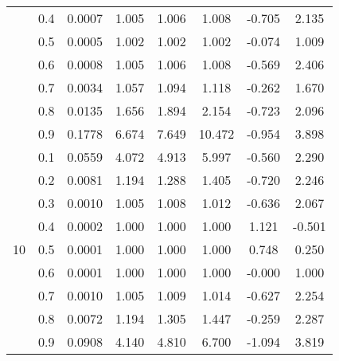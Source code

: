 \documentclass[11pt,a4paper]{report}
\begin{document}
\begin{longtable}{ | c | c || c | c | c | c | c | c | }
 & 0.4 & 0.0007 & 1.005 & 1.006 & 1.008 & -0.705 & 2.135 \\
 & 0.5 & 0.0005 & 1.002 & 1.002 & 1.002 & -0.074 & 1.009 \\
 & 0.6 & 0.0008 & 1.005 & 1.006 & 1.008 & -0.569 & 2.406 \\
 & 0.7 & 0.0034 & 1.057 & 1.094 & 1.118 & -0.262 & 1.670 \\
 & 0.8 & 0.0135 & 1.656 & 1.894 & 2.154 & -0.723 & 2.096 \\
 & 0.9 & 0.1778 & 6.674 & 7.649 & 10.472 & -0.954 & 3.898 \\
 \hline
\multirow{9}{*}{10} & 0.1 & 0.0559 & 4.072 & 4.913 & 5.997 & -0.560 & 2.290 \\
 & 0.2 & 0.0081 & 1.194 & 1.288 & 1.405 & -0.720 & 2.246 \\
 & 0.3 & 0.0010 & 1.005 & 1.008 & 1.012 & -0.636 & 2.067 \\
 & 0.4 & 0.0002 & 1.000 & 1.000 & 1.000 & 1.121 & -0.501 \\
 & 0.5 & 0.0001 & 1.000 & 1.000 & 1.000 & 0.748 & 0.250 \\
 & 0.6 & 0.0001 & 1.000 & 1.000 & 1.000 & -0.000 & 1.000 \\
 & 0.7 & 0.0010 & 1.005 & 1.009 & 1.014 & -0.627 & 2.254 \\
 & 0.8 & 0.0072 & 1.194 & 1.305 & 1.447 & -0.259 & 2.287 \\
 & 0.9 & 0.0908 & 4.140 & 4.810 & 6.700 & -1.094 & 3.819 \\
 \hline
\hline
\end{longtable}
\end{document}
